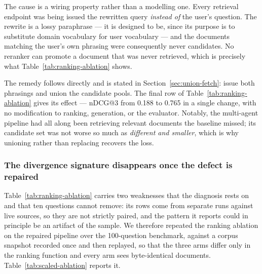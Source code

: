\documentclass[acmsmall,review,anonymous,screen]{acmart}
\begin{document}
The cause is a wiring property rather than a modelling one. Every retrieval
endpoint was being issued the rewritten query \emph{instead of} the user's
question. The rewrite is a lossy paraphrase --- it is designed to be, since its
purpose is to substitute domain vocabulary for user vocabulary --- and the
documents matching the user's own phrasing were consequently never candidates.
No reranker can promote a document that was never retrieved, which is precisely
what Table~\ref{tab:ranking-ablation} shows.

The remedy follows directly and is stated in Section~\ref{sec:union-fetch}: issue
both phrasings and union the candidate pools. The final row of
Table~\ref{tab:ranking-ablation} gives its effect --- nDCG@3 from 0.188 to 0.765
in a single change, with no modification to ranking, generation, or the
evaluator. Notably, the multi-agent pipeline had all along been retrieving
relevant documents the baseline missed; its candidate set was not worse so much
as \emph{different and smaller}, which is why unioning rather than replacing
recovers the loss.

\subsubsection*{The divergence signature disappears once the defect is repaired}

Table~\ref{tab:ranking-ablation} carries two weaknesses that the diagnosis rests
on and that ten questions cannot remove: its rows come from separate runs against
live sources, so they are not strictly paired, and the pattern it reports could in
principle be an artifact of the sample. We therefore repeated the ranking
ablation on the repaired pipeline over the 100-question benchmark, against a
corpus snapshot recorded once and then replayed, so that the three arms differ
only in the ranking function and every arm sees byte-identical documents.
Table~\ref{tab:scaled-ablation} reports it.
\end{document}
